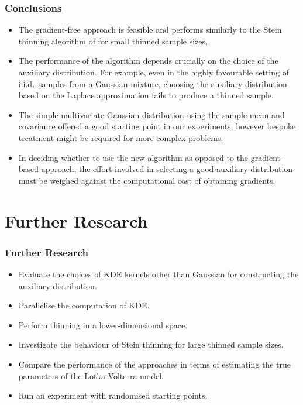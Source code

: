 \documentclass{beamer}
\begin{document}
\begin{frame}
\frametitle{Conclusions}

\begin{itemize}
\item The gradient-free approach is feasible and performs similarly to the Stein thinning algorithm of \cite{riabizOptimalThinningMCMC2022} for small thinned sample sizes,
\item The performance of the algorithm depends crucially on the choice of the auxiliary distribution. For example, even in the highly favourable setting of i.i.d.\ samples from a Gaussian mixture, choosing the auxiliary distribution based on the Laplace approximation fails to produce a thinned sample.
\item The simple multivariate Gaussian distribution using the sample mean and covariance offered a good starting point in our experiments, however bespoke treatment might be required for more complex problems.
\item In deciding whether to use the new algorithm as opposed to the gradient-based approach, the effort involved in selecting a good auxiliary distribution must be weighed against the computational cost of obtaining gradients.
\end{itemize}

\end{frame}

\section{Further Research}

\begin{frame}
\frametitle{Further Research}
\begin{itemize}

\item Evaluate the choices of KDE kernels other than Gaussian for constructing the auxiliary distribution.

\item Parallelise the computation of KDE.

\item Perform thinning in a lower-dimensional space.

\item Investigate the behaviour of Stein thinning for large thinned sample sizes.

\item Compare the performance of the approaches in terms of estimating the true parameters of the Lotka-Volterra model.

\item Run an experiment with randomised starting points.

\end{itemize}

\end{frame}
\end{document}
